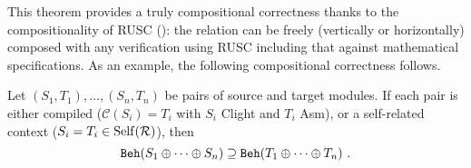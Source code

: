\noindent
This theorem provides a truly compositional correctness
thanks to the compositionality of RUSC ():
the relation can be freely (\ie vertically or horizontally) composed with any verification using RUSC
including that against mathematical specifications.
As an example, the following compositional correctness follows.
\begin{corollary} \label{thm:results-compiler}
  Let $(S_1,T_1), \ldots, (S_n,T_n)$ be pairs of source and target modules.
  If each pair is either compiled (\ie $\mathcal{C}(S_i) = T_i$ with $S_i$ \textrm{Clight} and $T_i$ \textrm{Asm}), or a self-related context (\ie $S_i = T_i \in \mathrm{Self}(\mathcal{R})$), then
  \[
    \mathtt{Beh}({S_1 \oplus \cdots \oplus S_n}) \supseteq \mathtt{Beh}({T_1 \oplus \cdots \oplus T_n})~.
  \]
\end{corollary}
